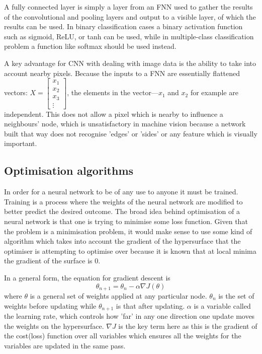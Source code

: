 \documentclass[a4paper,fleqn,usenatbib]{mnras}
\begin{document}
A fully connected layer is simply a layer from an FNN used to gather the results of the convolutional and pooling layers and output to a visible layer, of which the results can be used. In binary classification cases a binary activation function such as sigmoid, ReLU, or tanh can be used, while in multiple-class classification problem a function like softmax should be used instead. \cite{Goodfellow-et-al-2016}

A key advantage for CNN with dealing with image data is the ability to take into account nearby pixels. Because the inputs to a FNN are essentially flattened vectors: $X=\begin{bmatrix}
           x_{1} \\
           x_{2} \\
           x_{3} \\
           \vdots
         \end{bmatrix}$, the elements in the vector---$x_1$ and $x_2$ for example are independent. This does not allow a pixel which is nearby to influence a neighbours' node, which is unsatisfactory in machine vision because a network built that way does not recognise 'edges' or 'sides' or any feature which is visually important.

\subsection{Optimisation algorithms}
In order for a neural network to be of any use to anyone it must be trained. Training is a process where the weights of the neural network are modified to better predict the desired outcome. The broad idea behind optimisation of a neural network is that one is trying to minimise some loss function. Given that the problem is a minimisation problem, it would make sense to use some kind of algorithm which takes into account the gradient of the hypersurface that the optimiser is attempting to optimise over because it is known that at local minima the gradient of the surface is 0. 

In a general form, the equation for gradient descent is 
\begin{equation}
\theta_{n+1}=\theta_{n}-\alpha\nabla J(\theta)	
\end{equation}
where $\theta$ is a general set of weights applied at any particular node. $\theta_{n}$ is the set of weights before updating while $\theta_{n+1}$ is that after updating. $\alpha$ is a variable called the learning rate, which controls how 'far' in any one direction one update moves the weights on the hypersurface. $\nabla J$ is the key term here as this is the gradient of the cost(loss) function over all variables which ensures all the weights for the variables are updated in the same pass. \cite{GradientDescent}
\end{document}

